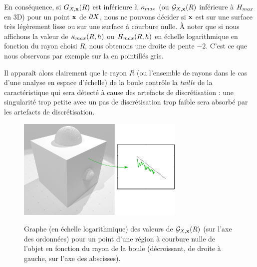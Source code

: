 En conséquence, si $G_{X,\mathbf{x}}(R)$ est inférieure à $\kappa_{max}$ (ou $\mathcal{G}_{X,\mathbf{x}}(R)$
inférieure à $H_{max}$ en 3D) pour un point $\mathbf{x}$ de $\partial X$, nous ne pouvons
décider si $\mathbf{x}$ est sur une surface très légèrement lisse ou sur une surface
à courbure nulle. À noter que si nous affichons la valeur de $\kappa_{max}(R,h)$ ou
$H_{max}(R,h)$ en échelle logarithmique en fonction du rayon choisi $R$,
nous obtenons une droite de pente $-2$. C'est ce que nous observons par exemple
sur la  en pointillés gris.


Il apparaît alors clairement que le rayon $R$ (ou l'ensemble de rayons dans le
cas d'une analyse en espace d'échelle) de la boule contrôle la \emph{taille} de
la caractéristique qui sera détecté à cause des artefacts de discrétisation :
une singularité trop petite avec un pas de discrétisation trop faible sera
absorbé par les artefacts de discrétisation.

\begin{figure}[ht]
\begin{center}
  {\includegraphics[width=8cm]{figures/CubeSpherePlot_F_NoColor}}
  \caption{Graphe (en échelle logarithmique) des valeurs de $\mathcal{G}_{X,\mathbf{x}}(R)$ (sur
  l'axe des ordonnées) pour un point d'une région à courbure nulle de l'objet
  \CubeSphere en fonction du rayon de la boule (décroissant, de droite à gauche,
  sur l'axe des abscisses).\label{fig:CubeSpherePlot_F_NoColor}}
\end{center}
\end{figure}

